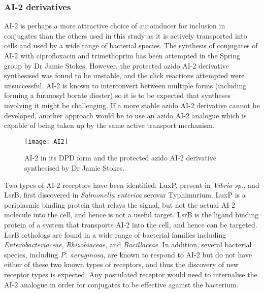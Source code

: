 \subsubsection{AI-2 derivatives}

AI-2  is perhaps a more attractive choice of autoinducer for inclusion in conjugates than the others used in this study as it is actively transported into cells\cite{Taga2003} and used by a wide range of bacterial species\cite{Pereira2013}.
The synthesis of conjugates of AI-2  with ciprofloxacin  and trimethoprim  has been attempted in the Spring group by Dr Jamie Stokes. However, the protected azido AI-2 derivative  synthesised was found to be unstable, and the click reactions attempted were unsuccessful\cite{Stokes2017}. AI-2  is known to interconvert between multiple forms (including forming a furanosyl borate diester)\cite{Guo2015} so it is to be expected that syntheses involving it might be challenging. If a more stable azido AI-2 derivative cannot be developed, another approach would be to use an azido AI-2  analogue which is capable of being taken up by the same active transport mechanism. 

\begin{figure}[H]
	\begin{center}
		\texttt{[image: AI2]}
		\caption{AI-2  in its DPD form and the protected azido AI-2 derivative  synthesised by Dr Jamie Stokes.
		\label{fgr:AI2}} 
	\end{center}
\end{figure}

Two types of AI-2  receptors have been identified: LuxP, present in \textit{Vibrio sp.}\cite{Chen2002}, and LsrB, first discovered in \textit{Salmonella enterica} serovar Typhimurium\cite{Miller2004}. 
LuxP is a periplasmic binding protein that relays the signal, but not the actual AI-2  molecule into the cell, and hence is not a useful target.\cite{Neiditch2005}
LsrB is the ligand binding protein of a system that transports AI-2  into the cell\cite{Taga2003}, and hence can be targeted. LsrB orthologs are found in a wide range of bacterial families including \textit{Enterobacteriaceae}, \textit{Rhizobiaceae}, and \textit{Bacillaceae}\cite{Pereira2009}.
In addition, several bacterial species, including \textit{P. aeruginosa}, are known to respond to AI-2  but do not have either of these two known types of receptors, and thus the discovery of new receptor types is expected\cite{Pereira2009}. Any postulated receptor would need to internalise the AI-2 analogue in order for conjugates to be effective against the bacterium.

